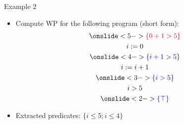 
\begin{frame}{Example 2}
\begin{figure}
\resizebox{\textwidth}{!}{
  
}
\end{figure}

\begin{itemize}  
  \item Compute WP for the following program (short form):    
  \begin{gather*}
  \onslide<5->{{\color{red} \{ 0 + 1 > 5\}} } \\
  i := 0 \\
  \onslide<4->{{\color{blue} \{i + 1 > 5\}} } \\
  i := i + 1 \\
  \onslide<3->{ {\color{blue} \{ i > 5 \} } }
  \\
  i > 5 \\
  \onslide<2->{ {\color{blue} \{ \top \}} }
  \\
  \end{gather*} 
  \item<6-> Extracted predicates: $\{ i \leq 5; i \leq 4 \}$
  
\end{itemize}
\end{frame}

